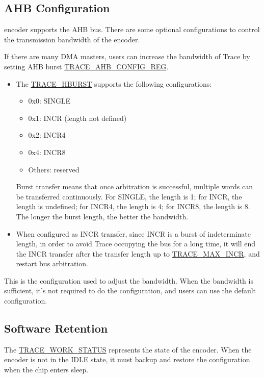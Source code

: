 \documentclass[main\_\_EN.tex]{subfiles}
\begin{document}
\subsection{AHB Configuration}

\chipname{} encoder supports the AHB bus. There are some optional configurations to control the transmission bandwidth of the encoder.

If there are many DMA masters, users can increase the bandwidth of Trace by setting AHB burst \hyperref[regdesc:TRACEAHBCONFIGREG]{TRACE\_AHB\_CONFIG\_REG}.
\begin{itemize}
    \item The \hyperref[fielddesc:TRACEHBURST]{TRACE\_HBURST} supports the following configurations:
        \begin{itemize}
            \item 0x0: SINGLE
            \item 0x1: INCR (length not defined)
            \item 0x2: INCR4
            \item 0x4: INCR8
            \item Others: reserved
        \end{itemize}
        Burst transfer means that once arbitration is successful, multiple words can be transferred continuously. For SINGLE, the length is 1; for INCR, the length is undefined; for INCR4, the length is 4; for INCR8, the length is 8. The longer the burst length, the better the bandwidth.

    \item When configured as INCR transfer, since INCR is a burst of indeterminate length, in order to avoid Trace occupying the bus for a long time, it will end the INCR transfer after the transfer length up to \hyperref[fielddesc:TRACEMAXINCR]{TRACE\_MAX\_INCR}, and restart bus arbitration.
\end{itemize}

This is the configuration used to adjust the bandwidth. When the bandwidth is sufficient, it's not required to do the configuration, and users can use the default configuration.

\subsection{Software Retention}

The \hyperref[fielddesc:TRACEWORKSTATUS]{TRACE\_WORK\_STATUS} represents the state of the encoder. When the encoder is not in the IDLE state, it must backup and restore the configuration when the chip enters sleep.
\end{document}
